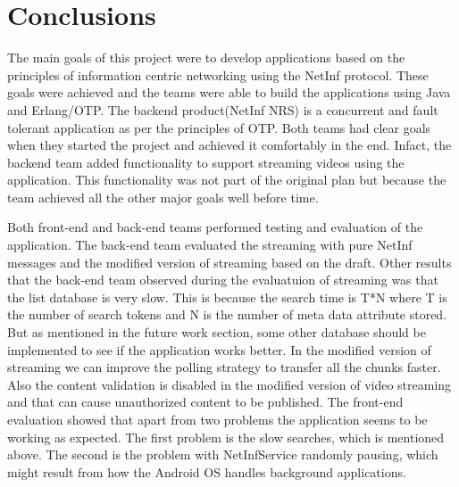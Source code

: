 \section{Conclusions}
The main goals of this project were to develop applications based on the principles of information centric networking using the NetInf protocol. These goals were achieved and the teams were able to build the applications using Java and Erlang/OTP. The backend product(NetInf NRS) is a concurrent and fault tolerant application as per the principles of OTP. Both teams had clear goals when they started the project and achieved it comfortably in the end. Infact, the backend team added functionality to support streaming videos using the application. This functionality was not part of the original plan but because the team achieved all the other major goals well before time.

Both front-end and back-end teams performed testing and evaluation of the application. The back-end team evaluated the streaming with pure NetInf messages and the modified version of streaming based on the draft. Other results that the back-end team observed during the evaluatuion of streaming was that the list database is very slow. This is because the search time is T*N where T is the number of search tokens and N is the number of meta data attribute stored. But as mentioned in the future work section, some other database should be implemented to see if the application works better. In the modified version of streaming we can improve the polling strategy to transfer all the chunks faster. Also the content validation is disabled in the modified version of video streaming and that can cause unauthorized content to be published. The front-end evaluation showed that apart from two problems the application seems to be working as expected. The first problem is the slow searches, which is mentioned above. The second is the problem with NetInfService randomly pausing, which might result from how the Android OS handles background applications.

 
